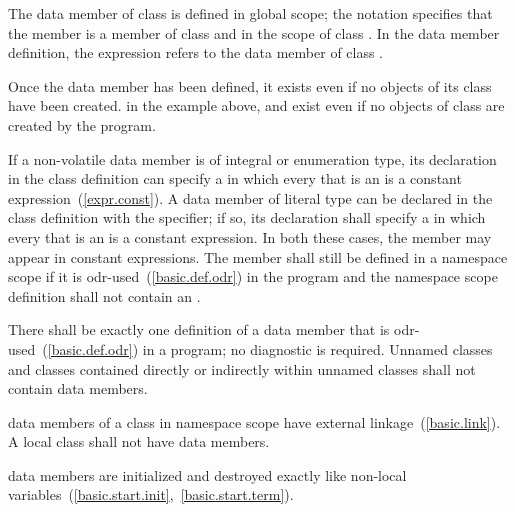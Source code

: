 The  data member  of class
 is defined in global scope; the notation
 specifies that the member 
is a member of class  and in the scope of class
. In the  data member definition, the
 expression refers to the  data
member  of class .
\exitexample

\enternote
Once the  data member has been defined, it exists even if
no objects of its class have been created.
\enterexample
in the example above,  and  exist even
if no objects of class  are created by the program.
\exitexample
\exitnote

\pnum
If a non-volatile   data member is
of integral or enumeration type,
its declaration in the class definition can specify a
 in which every
 that is an 
is a constant expression~(\ref{expr.const}). A  data member of
literal type can be declared in the class definition with the
 specifier; if so, its declaration shall specify a
 in which every
 that is an 
is a constant expression. \enternote In both these cases,
the member may appear in constant expressions. \exitnote The
member shall still be defined in a namespace scope if
it is odr-used~(\ref{basic.def.odr}) in the program and the
namespace scope definition shall not contain an .

\pnum
\enternote
There shall be exactly one definition of a  data member
that is odr-used~(\ref{basic.def.odr}) in a program; no diagnostic is required.
\exitnote
Unnamed classes and classes contained directly
or indirectly within unnamed classes shall not contain 
data members.

\pnum
{}%
 data members of a class in namespace scope have external
linkage~(\ref{basic.link}). A local class shall not have 
data members.

\pnum
{} data members are initialized and destroyed exactly like
non-local variables~(\ref{basic.start.init},~\ref{basic.start.term}).

